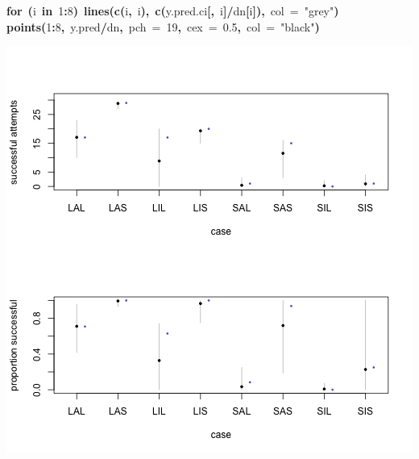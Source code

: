\documentclass{article}
\makeatletter
\newcommand{\hlnumber}[1]{\textcolor[rgb]{0,0,0}{#1}}%
\newcommand{\hlfunctioncall}[1]{\textcolor[rgb]{.5,0,.33}{\textbf{#1}}}%
\newcommand{\hlstring}[1]{\textcolor[rgb]{.6,.6,1}{#1}}%
\newcommand{\hlkeyword}[1]{\textbf{#1}}%
\newcommand{\hlargument}[1]{\textcolor[rgb]{.69,.25,.02}{#1}}%
\newcommand{\hlsymbol}[1]{#1}%
\newcommand{\hlstd}[1]{\textcolor[rgb]{0,0,0}{#1}}%
\newenvironment{kframe}{%
 \def\FrameCommand##1{\hskip\@totalleftmargin \hskip-\fboxsep
 \colorbox{shadecolor}{##1}\hskip-\fboxsep
     \hskip-\linewidth \hskip-\@totalleftmargin \hskip\columnwidth}%
 \MakeFramed {\advance\hsize-\width
   \@totalleftmargin\z@ \linewidth\hsize
   \@setminipage}}%
 {\par\unskip\endMakeFramed}
\newenvironment{knitrout}{}{} %
\makeatother
\begin{document}
\begin{knitrout}
{\begin{kframe}
\begin{flushleft}
\hlstd{}\hlkeyword{for}{\ }\hlkeyword{(}\hlsymbol{i}{\ }\hlkeyword{in}{\ }\hlnumber{1}\hlkeyword{:}\hlnumber{8}\hlkeyword{)}{\ }\hlfunctioncall{lines}\hlkeyword{(}\hlfunctioncall{c}\hlkeyword{(}\hlsymbol{i}\hlkeyword{,}{\ }\hlsymbol{i}\hlkeyword{)}\hlkeyword{,}{\ }\hlfunctioncall{c}\hlkeyword{(}\hlsymbol{y.pred.ci}\hlkeyword{[}\hlkeyword{,}{\ }\hlsymbol{i}\hlkeyword{]}\hlkeyword{/}\hlsymbol{d}\hlkeyword{\usebox{\hlnormalsizeboxdollar}}\hlsymbol{n}\hlkeyword{[}\hlsymbol{i}\hlkeyword{]}\hlkeyword{)}\hlkeyword{,}{\ }\hlargument{col}{\ }\hlargument{=}{\ }\hlstring{"grey"}\hlkeyword{)}\hspace*{\fill}\\
\hlstd{}\hlfunctioncall{points}\hlkeyword{(}\hlnumber{1}\hlkeyword{:}\hlnumber{8}\hlkeyword{,}{\ }\hlsymbol{y.pred}\hlkeyword{/}\hlsymbol{d}\hlkeyword{\usebox{\hlnormalsizeboxdollar}}\hlsymbol{n}\hlkeyword{,}{\ }\hlargument{pch}{\ }\hlargument{=}{\ }\hlnumber{19}\hlkeyword{,}{\ }\hlargument{cex}{\ }\hlargument{=}{\ }\hlnumber{0.5}\hlkeyword{,}{\ }\hlargument{col}{\ }\hlargument{=}{\ }\hlstring{"black"}\hlkeyword{)}\mbox{}
\normalfont
\end{flushleft}
\includegraphics{better-model-fig} \begin{flushleft}
\ttfamily\noindent
\hspace*{\fill}\\

\end{flushleft}
\end{kframe}}
\end{knitrout}
\end{document}
